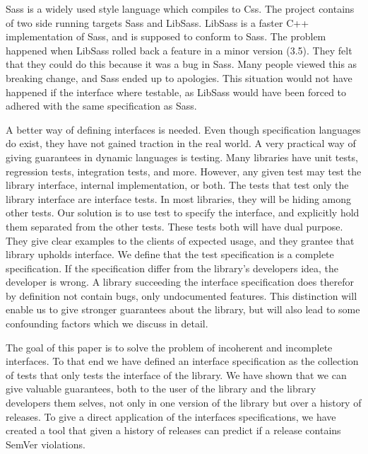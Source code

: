 Sass is a widely used style language which compiles to Css. The project
contains of two side running targets Sass and LibSass. LibSass is a 
faster C++ implementation of Sass, and is supposed to conform to Sass. The
problem happened when LibSass rolled back a feature in a minor version (3.5). 
They felt that they could do this because it was a bug in Sass. Many people 
viewed this as breaking change, and Sass ended up to apologies. This situation
would not have happened if the interface where testable, as LibSass would have
been forced to adhered with the same specification as Sass\cite{libsass}. 
%

A better way of defining interfaces is needed. Even though specification
languages do exist, they have not gained traction in the real world. A very
practical way of giving guarantees in dynamic languages is testing.  Many
libraries have unit tests, regression tests, integration tests, and more.
However, any given test may test the library interface, internal
implementation, or both.  The tests that test only the library interface are
interface tests. In most libraries, they will be hiding among other tests.  Our
solution is to use test to specify the interface, and explicitly hold them
separated from the other tests. These tests both will have dual purpose. They
give clear examples to the clients of expected usage, and they grantee that
library upholds interface. We define that the test specification is a complete
specification. If the specification differ from the library's developers idea,
the developer is wrong.  A library succeeding the interface specification does
therefor by definition not contain bugs, only undocumented features. This
distinction will enable us to give stronger guarantees about the library, but
will also lead to some confounding factors which we discuss in detail.

The goal of this paper is to solve the problem of incoherent and
incomplete interfaces. To that end we have defined an interface specification
as the collection of tests that only tests the interface of the library. We have
shown that we can give valuable guarantees, both to the user of the library and
the library developers them selves, not only in one version of the library but 
over a history of releases. To give a direct application of the interfaces 
specifications, we have created a tool that given a history of releases can
predict if a release contains SemVer violations. 

